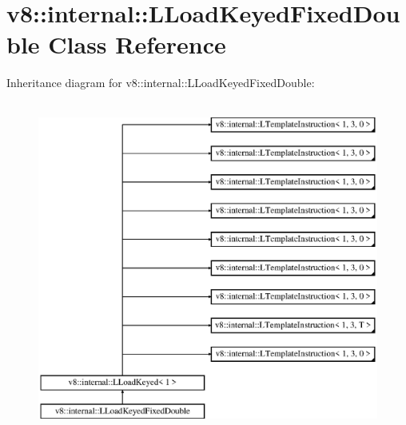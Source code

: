 \hypertarget{classv8_1_1internal_1_1_l_load_keyed_fixed_double}{}\section{v8\+:\+:internal\+:\+:L\+Load\+Keyed\+Fixed\+Double Class Reference}
\label{classv8_1_1internal_1_1_l_load_keyed_fixed_double}
Inheritance diagram for v8\+:\+:internal\+:\+:L\+Load\+Keyed\+Fixed\+Double\+:\begin{figure}[H]
\begin{center}
\leavevmode
\includegraphics[height=11.000000cm]{classv8_1_1internal_1_1_l_load_keyed_fixed_double}
\end{center}
\end{figure}
